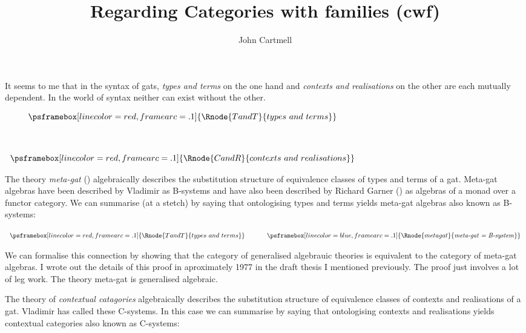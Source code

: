 \documentclass[10pt,a4paper]{article}
\theoremstyle{remark}
\newcommand{\attrtype}[1]{#1}
\renewcommand{\attrtype}[1]{\psframebox[linecolor=blue,framearc=.1]{#1}}
\newcommand{\etype}[1]{#1}
\renewcommand{\etype}[1]{\psframebox[linecolor=red,framearc=.1]{#1}}
\begin{document}
\title{Regarding Categories with families (cwf)}


\author{John Cartmell}


\note It seems to me that in the syntax of gats, \textit{types and terms} on the one hand and \textit{contexts and realisations} on the other are each mutually dependent. In the world 
of syntax neither can exist without the other.
\begin{center}
$
\begin{array}{ c }
\etype{\Rnode{TandT}{types\ and\ terms}} \\[1.3cm]
\etype{\Rnode{CandR}{contexts\ and\ realisations}}   
\end{array}                     
$
\setlength{\sarnodesepA}{7pt}
\setlength{\sarnodesepB}{7pt}
\setlength{\saroffsetA}{7pt}
\setlength{\saroffsetB}{7pt}
\end{center}


\note The theory \textit{meta-gat} (\cite{Cartmell14B}) algebraically describes the substitution structure of equivalence classes of types and terms of a gat. Meta-gat algebras have been described by Vladimir as B-systems and have also been described by Richard Garner (\cite{Garner15}) as algebras of a monad over a functor category.  We can summarise (at a stetch) by saying that ontologising types and terms yields meta-gat algebras also known as B-systems:

\begin{center}
$
\begin{array}{ c p{0.5cm} c}
\etype{\Rnode{TandT}{types\ and\ terms}} & & \attrtype{\Rnode{metagat}{\mbox{\textit{meta-gat = B-system}}}}
\end{array}                     
$
\setlength{\arrnodesepA}{7pt}
\setlength{\arrnodesepB}{7pt}
\end{center}

We can formalise this connection by showing that the category of generalised algebrauic theories 
is equivalent to the category of meta-gat algebras.  I wrote out the details of this proof in aproximately 1977 in the draft thesis I mentioned previously. The proof just involves a lot of leg work. The theory meta-gat is generalised algebraic.
 
\note The theory of \textit{contextual catagories} algebraically describes the substitution structure of equivalence classes of contexts and realisations of a gat. Vladimir has called  these C-systems. In this case we can summarise by saying that ontologising contexts and realisations yields contextual categories also known as C-systems:
\end{document}
